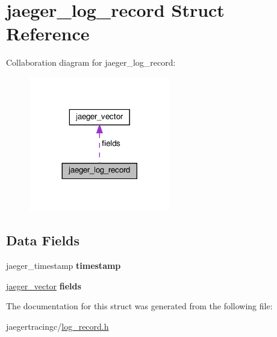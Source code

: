\hypertarget{structjaeger__log__record}{}\section{jaeger\+\_\+log\+\_\+record Struct Reference}
\label{structjaeger__log__record}


Collaboration diagram for jaeger\+\_\+log\+\_\+record\+:\nopagebreak
\begin{figure}[H]
\begin{center}
\leavevmode
\includegraphics[width=173pt]{structjaeger__log__record__coll__graph}
\end{center}
\end{figure}
\subsection*{Data Fields}
\begin{DoxyCompactItemize}
\item 
\mbox{\label{structjaeger__log__record_a0ccac56ec47a1f065b0a38b17d0c7a07}} 
jaeger\+\_\+timestamp {\bfseries timestamp}
\item 
\mbox{\label{structjaeger__log__record_a7e92d49bbf95a25adf10d22d0c87c70f}} 
\mbox{\hyperlink{structjaeger__vector}{jaeger\+\_\+vector}} {\bfseries fields}
\end{DoxyCompactItemize}


The documentation for this struct was generated from the following file\+:\begin{DoxyCompactItemize}
\item 
jaegertracingc/\mbox{\hyperlink{log__record_8h}{log\+\_\+record.\+h}}\end{DoxyCompactItemize}
